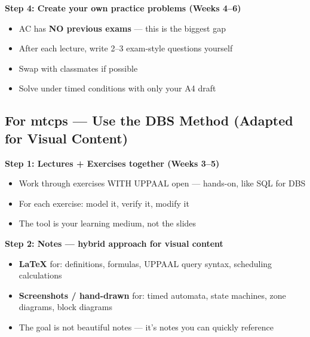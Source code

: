 \documentclass[11pt,a4paper]{article}
\begin{document}
\textbf{Step 4: Create your own practice problems (Weeks 4--6)}
\begin{itemize}[nosep]
\item AC has \textbf{NO previous exams} --- this is the biggest gap
\item After each lecture, write 2--3 exam-style questions yourself
\item Swap with classmates if possible
\item Solve under timed conditions with only your A4 draft
\end{itemize}


\vspace{0.5em}

\subsection{\textcolor{mtcpscolor}{For mtcps --- Use the DBS Method (Adapted for Visual Content)}}

\textbf{Step 1: Lectures + Exercises together (Weeks 3--5)}
\begin{itemize}[nosep]
\item Work through exercises WITH UPPAAL open --- hands-on, like SQL for DBS
\item For each exercise: model it, verify it, modify it
\item The tool is your learning medium, not the slides
\end{itemize}

\textbf{Step 2: Notes --- hybrid approach for visual content}
\begin{itemize}[nosep]
\item \textbf{LaTeX} for: definitions, formulas, UPPAAL query syntax, scheduling calculations
\item \textbf{Screenshots / hand-drawn} for: timed automata, state machines, zone diagrams, block diagrams
\item The goal is not beautiful notes --- it's notes you can quickly reference
\end{itemize}
\end{document}
